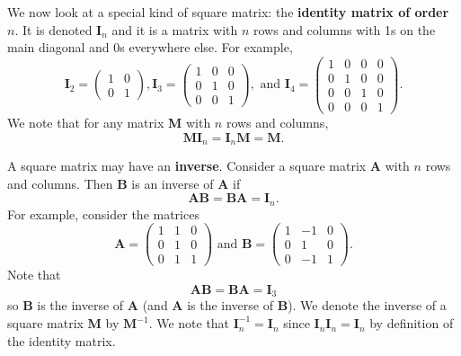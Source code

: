 We now look at a special kind of square matrix: the \textbf{identity matrix of order $n$}. It is denoted $\textbf{I}_n$ and it is a matrix with $n$ rows and columns with 1s on the main diagonal and 0s everywhere else. For example,
\[
    \textbf{I}_2 = \begin{pmatrix}1 & 0\\0 & 1\end{pmatrix},
\textbf{I}_3 = \begin{pmatrix}1 & 0 & 0\\0 & 1 & 0\\0 & 0 & 1\end{pmatrix}, \text{ and }
\textbf{I}_4 = \begin{pmatrix}1 & 0 & 0 & 0\\0 & 1 & 0 & 0\\0 & 0 & 1 & 0\\0 & 0 & 0 & 1\end{pmatrix}.
\]
We note that for any matrix \textbf{M} with $n$ rows and columns,
\[
    \textbf{MI}_n = \textbf{I}_n\textbf{M} = \textbf{M}.
\]

A square matrix may have an \textbf{inverse}. Consider a square matrix \textbf{A} with $n$ rows and columns. Then \textbf{B} is an inverse of \textbf{A} if
\[
    \textbf{AB} = \textbf{BA} = \textbf{I}_n.
\]
For example, consider the matrices
\[
    \textbf{A} = \begin{pmatrix}1&1&0\\ 0&1&0\\ 0&1&1\end{pmatrix} \text{ and } \textbf{B} = \begin{pmatrix}1&-1&0\\0&1&0\\0&-1&1\end{pmatrix}.
\]
Note that
\[
    \textbf{AB} = \textbf{BA} = \textbf{I}_3
\]
so \textbf{B} is the inverse of \textbf{A} (and \textbf{A} is the inverse of \textbf{B}). We denote the inverse of a square matrix \textbf{M} by $\textbf{M}^{-1}$. We note that $\textbf{I}_n^{-1} = \textbf{I}_n$ since $\textbf{I}_n\textbf{I}_n = \textbf{I}_n$ by definition of the identity matrix.

